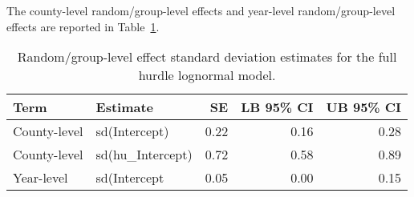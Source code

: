 \documentclass[
  letterpaper,
  DIV=11,
  numbers=noendperiod]{scrartcl}
\begin{document}
The county-level random/group-level effects and year-level
random/group-level effects are reported in Table~\ref{tbl-brms2-re}.

\hypertarget{tbl-brms2-re}{}
\begin{table}
\caption{\label{tbl-brms2-re}Random/group-level effect standard deviation estimates for the full
hurdle lognormal model. }\tabularnewline

\centering
\begin{tabular}{l|l|r|r|r}
\hline
Term & Estimate & SE & LB 95\% CI & UB 95\% CI\\
\hline
County-level & sd(Intercept) & 0.22 & 0.16 & 0.28\\
\hline
County-level & sd(hu\_Intercept) & 0.72 & 0.58 & 0.89\\
\hline
Year-level & sd(Intercept & 0.05 & 0.00 & 0.15\\
\hline
\end{tabular}
\end{table}
\end{document}
